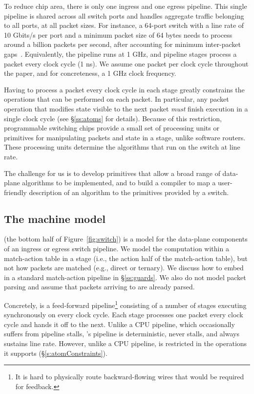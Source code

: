 To reduce chip area, there is only one ingress and one egress pipeline.  This
single pipeline is shared across all switch ports and handles aggregate traffic
belonging to all ports, at all packet sizes.  For instance, a 64-port switch
with a line rate of 10 Gbits/s per port and a minimum packet size of 64 bytes
needs to process around a billion packets per second, after accounting for
minimum inter-packet gaps~\cite{rmt}.  Equivalently, the pipeline runs at 1
GHz, and pipeline stages process a packet every clock cycle (1 ns).  We assume
one packet per clock cycle throughout the paper, and for concreteness, a
1 GHz clock frequency.

Having to process a packet every clock cycle in each stage greatly constrains
the operations that can be performed on each packet. In particular, any packet
operation that modifies state visible to the next packet {\em must} finish
execution in a single clock cycle (see \S\ref{ss:atoms} for details). Because
of this restriction, programmable switching chips provide a small set of
processing units or primitives for manipulating packets and state in a stage,
unlike software routers. These processing units determine the algorithms that
run on the switch at line rate.

The challenge for us is to develop primitives that allow a broad range of
data-plane algorithms to be implemented, and to build a compiler to map a
user-friendly description of an algorithm to the primitives provided by a
switch.

\subsection{The \absmachine machine model}

\absmachine (the bottom half of Figure~\ref{fig:switch}) is a model for the
data-plane components of an ingress or egress switch pipeline.  We model the
computation within a match-action table in a stage (i.e., the action half of
the match-action table), but not how packets are matched (e.g., direct or
ternary). We discuss how to embed \absmachine in a standard match-action
pipeline in \S\ref{ss:guards}.  We also do not model packet parsing and assume
that packets arriving to \absmachine are already parsed.

 Concretely, \absmachine is a feed-forward pipeline\footnote{It is hard to
physically route backward-flowing wires that would be required for feedback.}
consisting of a number of stages executing synchronously on every clock cycle.
Each stage processes one packet every clock cycle and hands it off to the next.
Unlike a CPU pipeline, which occasionally suffers from pipeline stalls,
\absmachine's pipeline is deterministic, never stalls, and always sustains line
rate. However, unlike a CPU pipeline, \absmachine is restricted in the
operations it supports (\S\ref{s:atomConstraints}).

